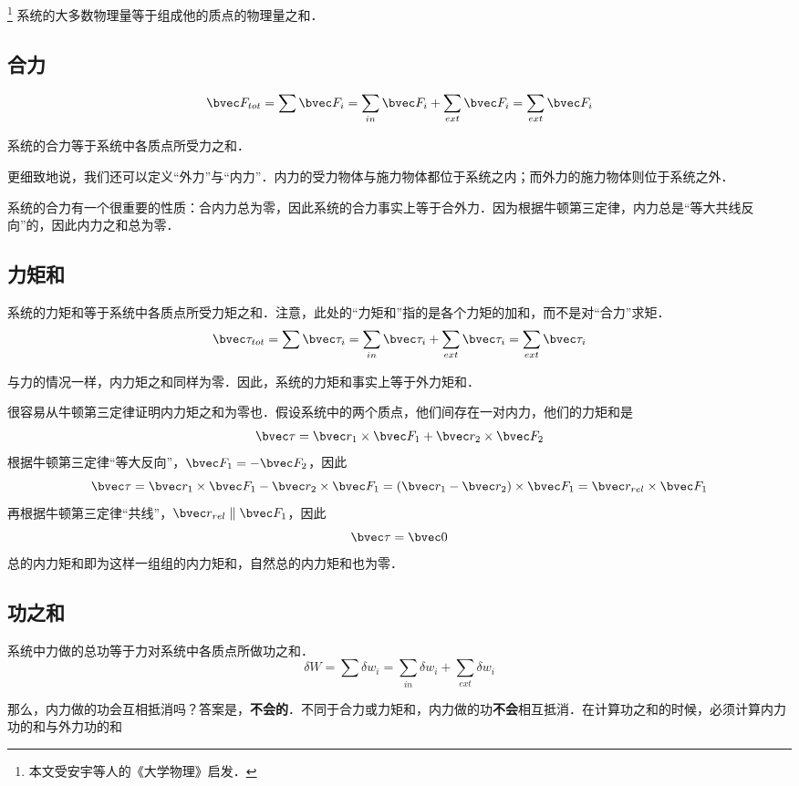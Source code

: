 

\footnote{本文受安宇等人的《大学物理》启发．}
系统的大多数物理量等于组成他的质点的物理量之和．
\subsection{合力}
\begin{equation}
\bvec F_{tot}=\sum \bvec F_i=\sum_{in} \bvec F_i + \sum_{ext} \bvec F_i = \sum_{ext} \bvec F_i
\end{equation}

系统的合力等于系统中各质点所受力之和．

更细致地说，我们还可以定义“外力”与“内力”．内力的受力物体与施力物体都位于系统之内；而外力的施力物体则位于系统之外．

系统的合力有一个很重要的性质：合内力总为零，因此系统的合力事实上等于合外力．因为根据牛顿第三定律，内力总是“等大共线反向”的，因此内力之和总为零．

\subsection{力矩和}
系统的力矩和等于系统中各质点所受力矩之和．注意，此处的“力矩和”指的是各个力矩的加和，而不是对“合力”求矩．
\begin{equation}
\bvec \tau_{tot}=\sum \bvec \tau_i=\sum_{in} \bvec \tau_i + \sum_{ext} \bvec \tau_i = \sum_{ext} \bvec \tau_i
\end{equation}

与力的情况一样，内力矩之和同样为零．因此，系统的力矩和事实上等于外力矩和．

很容易从牛顿第三定律证明内力矩之和为零也．假设系统中的两个质点，他们间存在一对内力，他们的力矩和是
$$\bvec \tau = \bvec r_1 \times \bvec F_1 + \bvec r_2 \times \bvec F_2$$
根据牛顿第三定律“等大反向”，$\bvec F_1=-\bvec F_2$，因此
$$\bvec \tau = \bvec r_1 \times \bvec F_1 - \bvec r_2 \times \bvec F_1 = (\bvec r_1 - \bvec r_2) \times \bvec F_1 = \bvec r_{rel}\times \bvec F_1$$
再根据牛顿第三定律“共线”，$\bvec r_{rel} \parallel \bvec F_1 $，因此
$$\bvec \tau = \bvec 0$$
总的内力矩和即为这样一组组的内力矩和，自然总的内力矩和也为零．

\subsection{功之和}
系统中力做的总功等于力对系统中各质点所做功之和．
\begin{equation}
\delta W = \sum \delta w_i = \sum_{in} \delta w_i + \sum_{ext} \delta w_i
\end{equation}

那么，内力做的功会互相抵消吗？答案是，\textbf{不会的}．不同于合力或力矩和，内力做的功\textbf{不会}相互抵消．在计算功之和的时候，必须计算内力功的和与外力功的和
